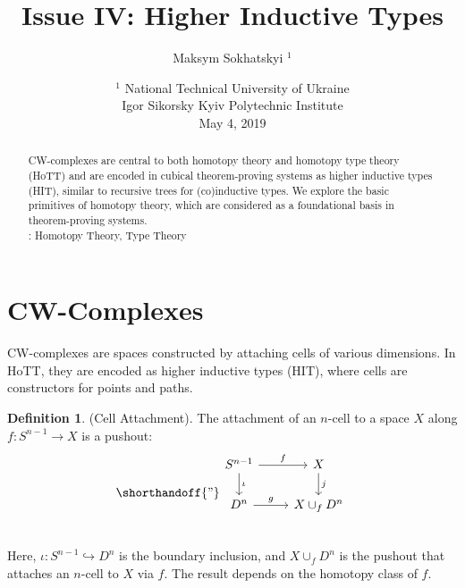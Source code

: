 \documentclass{article}
\theoremstyle{definition}
\newtheorem{definition}{Definition}
\newcommand*{\incmap}{\hookrightarrow}
\begin{document}
\title{Issue IV: Higher Inductive Types}
\author{Maksym Sokhatskyi $^1$}
\date{ $^1$ National Technical University of Ukraine \\
       \small Igor Sikorsky Kyiv Polytechnic Institute \\
       May 4, 2019 }
\maketitle

\begin{abstract}
CW-complexes are central to both homotopy theory and homotopy type theory (HoTT) and are encoded
in cubical theorem-proving systems as higher inductive types (HIT), similar to recursive
trees for (co)inductive types. We explore the basic primitives of homotopy theory,
which are considered as a foundational basis in theorem-proving systems. \\
: Homotopy Theory, Type Theory
\end{abstract}

\ifincludeTOC
  \tableofcontents
\fi

\section{CW-Complexes}
CW-complexes are spaces constructed by attaching cells of various
dimensions. In HoTT, they are encoded as higher inductive types (HIT),
where cells are constructors for points and paths.

\begin{definition} (Cell Attachment).
The attachment of an $n$-cell to a space \( X \)
along \( f : S^{n-1} \to X \) is a pushout:
\[
\shorthandoff{"}
\begin{tikzcd}
S^{n-1} \arrow[r, "f"] \arrow[d, "\iota"] & X \arrow[d, "j"] \\
D^n \arrow[r, "g"]                        & X \cup_f D^n \\
\end{tikzcd}
\]
Here, \( \iota : S^{n-1} \incmap D^n \) is the boundary inclusion,
and \( X \cup_f D^n \) is the pushout that attaches an $n$-cell to \( X \) via \( f \). The result depends on
the homotopy class of \( f \).
\end{definition}
\end{document}
